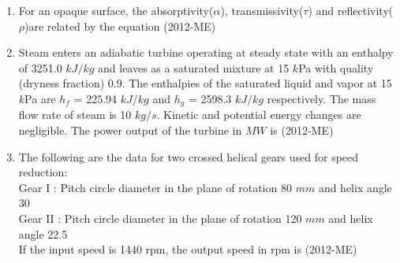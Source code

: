 \documentclass[journal,12pt,twocolumn]{IEEEtran}
\theoremstyle{remark}
\begin{document}
\begin{enumerate}
\item For an opaque surface, the absorptivity($\alpha$), transmissivity($\tau$) and reflectivity($\rho$)are related by the equation \hfill{(2012-ME)} 
                 \begin{enumerate}   
                         \end{enumerate}


\item Steam enters an adiabatic turbine operating at steady state with an enthalpy of 3251.0 $kJ/kg$ and leaves as a saturated mixture at 15 $k$Pa with quality (dryness fraction) 0.9. The enthalpies of the saturated liquid and vapor at 15 $k$Pa are $h_f$ = 225.94 $kJ/kg$ and $h_g$ = 2598.3 $kJ/kg$ respectively. The mass flow rate of steam is 10 $kg/s$. Kinetic and potential energy changes are negligible. The power output of the turbine in $MW$ is \hfill{(2012-ME)} 
  \begin{enumerate}   
   \end{enumerate}


\item The following are the data for two crossed helical gears used for speed reduction:\\
Gear I : Pitch circle diameter in the plane of rotation 80 $mm$ and helix angle 30\degree \\
Gear II : Pitch circle diameter in the plane of rotation 120 $mm$ and helix angle 22.5\degree \\
If the input speed is 1440 rpm, the output speed in rpm is \hfill{(2012-ME)} 
                 \begin{enumerate}   
       \end{enumerate}



\end{enumerate}
\end{document}
